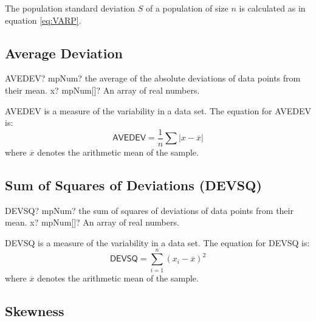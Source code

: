 The population standard deviation $S$ of a population of size $n$ is calculated as in equation \ref{eq:VARP}.






\subsection{Average Deviation}

\begin{mpFunctionsExtract}
	\mpWorksheetFunctionOneNotImplemented
	{AVEDEV? mpNum? the average of the absolute deviations of data points from their mean.}
	{x? mpNum[]? An array of real numbers.}
\end{mpFunctionsExtract}

\vspace{0.3cm}

\textsf{AVEDEV} is a measure of the variability in a data set. The equation for \textsf{AVEDEV} is: 
\begin{equation}
	\textsf{AVEDEV} = \frac{1}{n}\sum |x-\overline{x}|
\end{equation}
where $\overline{x}$ denotes the arithmetic mean of the sample.




\subsection{Sum of Squares of Deviations (DEVSQ)}

\begin{mpFunctionsExtract}
	\mpWorksheetFunctionOneNotImplemented
	{DEVSQ? mpNum? the sum of squares of deviations of data points from their mean.}
	{x? mpNum[]? An array of real numbers.}
\end{mpFunctionsExtract}

\vspace{0.3cm}

\textsf{DEVSQ} is a measure of the variability in a data set. The equation for \textsf{DEVSQ} is: 
\begin{equation}
	\textsf{DEVSQ} = \sum_{i=1}^n (x_i-\overline{x})^2
\end{equation}
where $\overline{x}$ denotes the arithmetic mean of the sample.




\subsection{Skewness}

